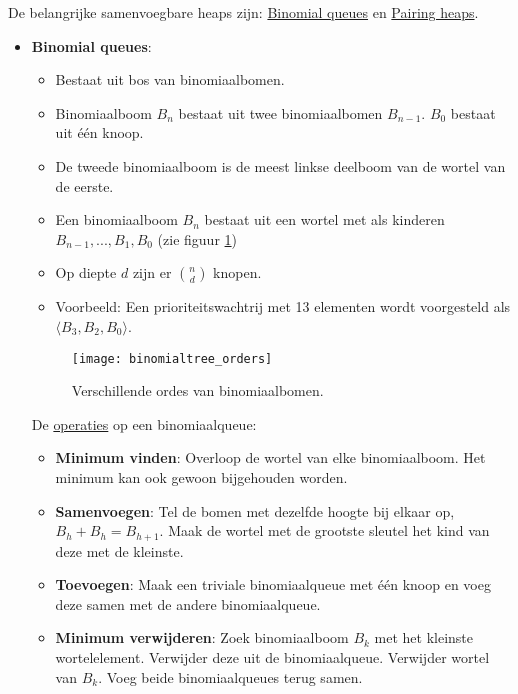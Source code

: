 \documentclass{report}
\begin{document}
De belangrijke samenvoegbare heaps zijn: \underline{Binomial queues} en \underline{Pairing heaps}.
\begin{itemize}
	\item \textbf{Binomial queues}:
		\begin{itemize}
			\item Bestaat uit bos van binomiaalbomen.
			\item Binomiaalboom $B_n$ bestaat uit twee binomiaalbomen $B_{n-1}$. $B_0$ bestaat uit één knoop.
			\item De tweede binomiaalboom is de meest linkse deelboom van de wortel van de eerste.
			\item Een binomiaalboom $B_n$ bestaat uit een wortel met als kinderen $B_{n-1}, ..., B_1, B_0$ (zie figuur \ref{fig:binomialtree_orders})
			\item Op diepte $d$ zijn er $\binom{n}{d}$ knopen.
			\item Voorbeeld: Een prioriteitswachtrij met 13 elementen wordt voorgesteld als $\langle B_3, B_2, B_0 \rangle$.
		\end{itemize}
		\begin{figure}[ht]
			\centering
			\texttt{[image: binomialtree\_orders]}
			\caption{Verschillende ordes van binomiaalbomen.}
			\label{fig:binomialtree_orders}
		\end{figure}

		De \underline{operaties} op een binomiaalqueue:
		\begin{itemize}
			\item \textbf{Minimum vinden}: Overloop de wortel van elke binomiaalboom. Het minimum kan ook gewoon bijgehouden worden.
			\item \textbf{Samenvoegen}: Tel de bomen met dezelfde hoogte bij elkaar op, $B_h + B_h = B_{h + 1}$. Maak de wortel met de grootste sleutel het kind van deze met de kleinste. 
			\item \textbf{Toevoegen}: Maak een triviale binomiaalqueue met één knoop en voeg deze samen met de andere binomiaalqueue.
			\item \textbf{Minimum verwijderen}: Zoek binomiaalboom $B_k$ met het kleinste wortelelement. Verwijder deze uit de binomiaalqueue. Verwijder wortel van  $B_k$. Voeg beide binomiaalqueues terug samen.
		\end{itemize}


\end{itemize}
\end{document}

